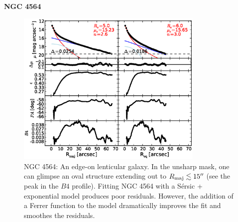 \documentclass[preprint2]{emulateapj}
\newcommand{\fitfigurewidth}{0.8\textwidth}
\begin{document}
  \clearpage\newpage\noindent
  {\bf NGC 4564 \\}

  \begin{figure}[h]
  \begin{center}
  \includegraphics[width=\fitfigurewidth]{n4564_1Dfit.eps}
  \caption{NGC 4564: 
  An edge-on lenticular galaxy.
  In the unsharp mask, one can glimpse an oval structure extending out to $R_{\rm maj} \lesssim 15''$ (see the peak in the $B4$ profile).
  Fitting NGC 4564 with a S\'ersic + exponential model produces poor residuals.
  However, the addition of a Ferrer function to the model dramatically improves the fit and smoothes the residuals.
  }
  \end{center}
  \end{figure}
\end{document}
